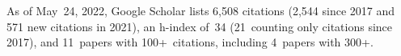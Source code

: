 %
As of May~24, 2022, Google Scholar lists
6,508 citations (2,544 since 2017 and 571 new citations in 2021),
an h-index of~34 (21~counting only citations since 2017),
and 11~papers with 100+~citations, including 4~papers with 300+.
